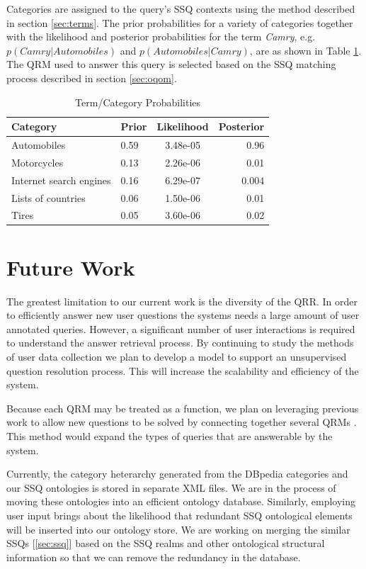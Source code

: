 Categories are assigned to the query's SSQ contexts using the method described in section \ref{sec:terms}. The prior probabilities for a variety of categories
together with the likelihood and posterior probabilities for the term \emph{Camry}, e.g. $p(Camry | Automobiles)$ and $p(Automobiles | Camry )$, are as
shown in Table \ref{tab:prob}.
The QRM used to answer this query is selected based on the SSQ matching
process described in section \ref{sec:oqom}.
\begin{table}
  \begin{tabular}{ | l | l | c | r | }
    \hline
    Category & Prior & Likelihood & Posterior \\ \hline
    Automobiles & 0.59 & 3.48e-05 & 0.96 \\ 
    Motorcycles & 0.13 & 2.26e-06 & 0.01 \\
    Internet search engines & 0.16 & 6.29e-07 & 0.004 \\ 
    Lists of countries & 0.06 & 1.50e-06 & 0.01 \\
    Tires & 0.05 & 3.60e-06 & 0.02 \\
    \hline
  \end{tabular}
\caption{Term/Category Probabilities}
\label{tab:prob}
\end{table}

\section{Future Work}

The greatest limitation to our current work is the diversity of the
QRR.  In order to efficiently answer new user questions the systems
needs a large amount of user annotated queries.  However, a
significant number of user interactions is required to understand the
answer retrieval process.  By continuing to study the methods of user
data collection we plan to develop a model to support an unsupervised
question resolution process.  This will increase the scalability and
efficiency of the system.

Because each QRM may be treated as a function, we plan on leveraging
previous work to allow new questions to be solved by connecting
together several QRMs \cite{morpheus1, transformscout}.  This method
would expand the types of queries that are answerable by the system.

Currently, the category heterarchy generated from the DBpedia
categories and our SSQ ontologies is stored in separate XML files. We
are in the process of moving these ontologies into an efficient
ontology database. Similarly, employing user input brings about the
likelihood that redundant SSQ ontological elements will be inserted
into our ontology store. We are working on merging the similar SSQs
[\ref{sec:ssq}] based on the SSQ realms and other ontological
structural information so that we can remove the redundancy in the
database.

